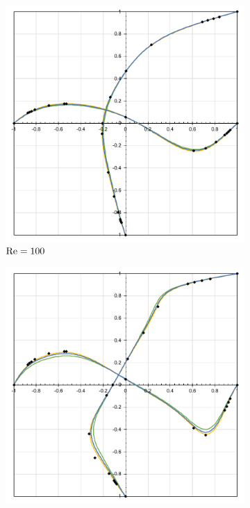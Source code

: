 \begin{figure}[h!]
    \centering
    \caption{Valores do campo de velocidades sobre as linhas médias da cavidade.}
    \begin{subfigure}{0.4\textwidth}
        \includegraphics[width=\linewidth]{Figuras/Cavity/Re100.pdf}
        \caption{$\mathrm{Re}=100$}
    \end{subfigure}
    \begin{subfigure}{0.4\textwidth}
        \includegraphics[width=\linewidth]{Figuras/Cavity/Re400.pdf}

\end{subfigure}
\end{figure}
